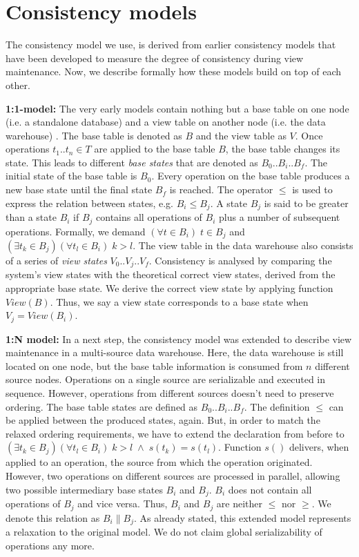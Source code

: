 \section{Consistency models}
\label{sec:consistency_models}

The consistency model we use, is derived from earlier consistency
models that have been developed to measure the degree of consistency
during view maintenance. Now, we describe formally how these models build on
top of each other.

\textbf{1:1-model:} The very early models contain nothing but a base 
table on one node (i.e. a standalone database) and a view table on 
another node (i.e. the data warehouse) \cite{zhuge:view}. The base table 
is denoted as $B$ and the view table as $V$. Once operations $t_1..t_n 
\in T$ are applied to the base table $B$, the base table changes its 
state. This leads to different \textit{base states} that are denoted as 
$B_0..B_i..B_f$. The initial state of the base table is $B_0$. Every 
operation on the base table produces a new base state until the final 
state $B_f$ is reached. The operator $\leq$ is used to express the 
relation between states, e.g. $B_i \leq B_j$. A state $B_j$ is said to 
be greater than a state $B_i$ if $B_j$ contains all operations of $B_i$ 
plus a number of subsequent operations. Formally, we demand $(\forall t 
\in B_i)\;t \in B_j$ and $(\exists t_k \in B_j)(\forall t_l \in B_i)\;k 
> l $. The view table in the data warehouse also consists of a series of 
\textit{view states} $V_0..V_j..V_f$. Consistency is analysed by 
comparing the system's view states with the theoretical correct view 
states, derived from the appropriate base state. We derive the correct 
view state by applying function $View(B)$. Thus, we say a view state 
corresponds to a base state when $V_j=View(B_i)$. 


\textbf{1:N model:} In a next step, the consistency model was extended 
to describe view maintenance in a multi-source data 
warehouse\cite{zhuge:strobe}. Here, the data warehouse is still located 
on one node, but the base table information is consumed from $n$ 
different source nodes. Operations on a single source are serializable 
and executed in sequence. However, operations from different sources 
doesn't need to preserve ordering. The base table states are defined as 
$B_0..B_i..B_f$. The definition $\leq$ can be applied between the 
produced states, again. But, in order to match the relaxed ordering 
requirements, we have to extend the declaration from before to $(\exists 
t_k \in B_j)(\forall t_l \in B_i)\;k > l\;\land\;s(t_k)=s(t_l)$. 
Function $s()$ delivers, when applied to an operation, the source from 
which the operation originated. However, two operations on different 
sources are processed in parallel, allowing two possible intermediary 
base states $B_i$ and $B_j$. $B_i$ does not contain all operations of 
$B_j$ and vice versa. Thus, $B_i$ and $B_j$ are neither $\leq$ nor 
$\geq$. We denote this relation as $B_i \parallel B_j$. As already 
stated, this extended model represents a relaxation to the original 
model. We do not claim global serializability of operations any more. 


